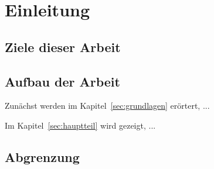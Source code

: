 \section{Einleitung}
\label{sec:einleitung}


\subsection{Ziele dieser Arbeit}


\subsection{Aufbau der Arbeit}

Zunächst werden im Kapitel~\ref{sec:grundlagen} erörtert, ...

Im Kapitel~\ref{sec:hauptteil} wird gezeigt, ...

\subsection{Abgrenzung}

